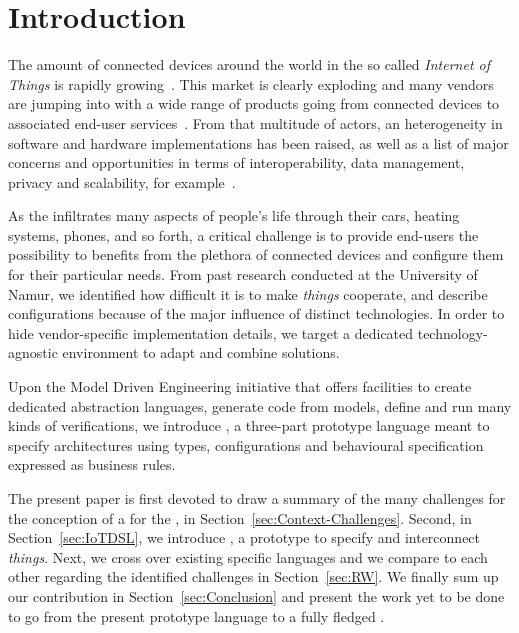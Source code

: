 \section{Introduction}
\label{sec:Introduction}

The amount of connected devices around the world in the so called \textit{Internet of Things} is rapidly growing~\cite{gartner-15}. This \IOT market is clearly exploding and many vendors are jumping into with a wide range of products going from connected devices to associated end-user services~\cite{lee-15}. From that multitude of actors, an heterogeneity in software and hardware implementations has been raised, as well as a list of major concerns and opportunities in terms of interoperability, data management, privacy and scalability, for example~\cite{chaqfeh-12}.

As the \IOT infiltrates many aspects of people's life through their cars, heating systems, phones, and so forth, a critical challenge is to provide end-users the possibility to benefits from the plethora of connected devices and configure them for their particular needs. From past research conducted at the University of Namur, we identified how difficult it is to make \textit{things} cooperate, and describe configurations because of the major influence of distinct technologies. In order to hide vendor-specific implementation details, we target a dedicated technology-agnostic environment to adapt and combine \IOT solutions.

Upon the Model Driven Engineering initiative that offers facilities to create dedicated abstraction languages, generate code from models, define and run many kinds of verifications, we introduce \IOTDSL, a three-part prototype language meant to specify \IOT architectures using types, configurations and behavioural specification expressed as business rules.

The present paper is first devoted to draw a summary of the many challenges for the conception of a \DSL for the \IOT, in Section~\ref{sec:Context-Challenges}. Second, in Section~\ref{sec:IoTDSL}, we introduce \IOTDSL, a prototype \DSL to specify and interconnect \textit{things}. Next, we cross over existing specific languages and we compare to each other regarding the identified challenges in Section~\ref{sec:RW}. We finally sum up our contribution in Section~\ref{sec:Conclusion} and present the work yet to be done to go from the present prototype language to a fully fledged \DSL.